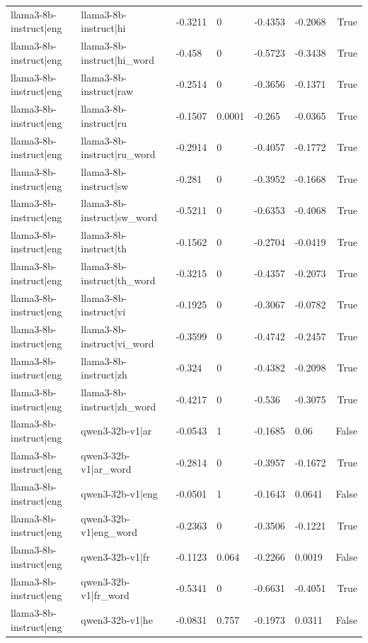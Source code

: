 \begin{table}
\begin{tabular}{llllllr}
llama3-8b-instruct|eng & llama3-8b-instruct|hi & -0.3211 & 0 & -0.4353 & -0.2068 & True \\
llama3-8b-instruct|eng & llama3-8b-instruct|hi_word & -0.458 & 0 & -0.5723 & -0.3438 & True \\
llama3-8b-instruct|eng & llama3-8b-instruct|raw & -0.2514 & 0 & -0.3656 & -0.1371 & True \\
llama3-8b-instruct|eng & llama3-8b-instruct|ru & -0.1507 & 0.0001 & -0.265 & -0.0365 & True \\
llama3-8b-instruct|eng & llama3-8b-instruct|ru_word & -0.2914 & 0 & -0.4057 & -0.1772 & True \\
llama3-8b-instruct|eng & llama3-8b-instruct|sw & -0.281 & 0 & -0.3952 & -0.1668 & True \\
llama3-8b-instruct|eng & llama3-8b-instruct|sw_word & -0.5211 & 0 & -0.6353 & -0.4068 & True \\
llama3-8b-instruct|eng & llama3-8b-instruct|th & -0.1562 & 0 & -0.2704 & -0.0419 & True \\
llama3-8b-instruct|eng & llama3-8b-instruct|th_word & -0.3215 & 0 & -0.4357 & -0.2073 & True \\
llama3-8b-instruct|eng & llama3-8b-instruct|vi & -0.1925 & 0 & -0.3067 & -0.0782 & True \\
llama3-8b-instruct|eng & llama3-8b-instruct|vi_word & -0.3599 & 0 & -0.4742 & -0.2457 & True \\
llama3-8b-instruct|eng & llama3-8b-instruct|zh & -0.324 & 0 & -0.4382 & -0.2098 & True \\
llama3-8b-instruct|eng & llama3-8b-instruct|zh_word & -0.4217 & 0 & -0.536 & -0.3075 & True \\
llama3-8b-instruct|eng & qwen3-32b-v1|ar & -0.0543 & 1 & -0.1685 & 0.06 & False \\
llama3-8b-instruct|eng & qwen3-32b-v1|ar_word & -0.2814 & 0 & -0.3957 & -0.1672 & True \\
llama3-8b-instruct|eng & qwen3-32b-v1|eng & -0.0501 & 1 & -0.1643 & 0.0641 & False \\
llama3-8b-instruct|eng & qwen3-32b-v1|eng_word & -0.2363 & 0 & -0.3506 & -0.1221 & True \\
llama3-8b-instruct|eng & qwen3-32b-v1|fr & -0.1123 & 0.064 & -0.2266 & 0.0019 & False \\
llama3-8b-instruct|eng & qwen3-32b-v1|fr_word & -0.5341 & 0 & -0.6631 & -0.4051 & True \\
llama3-8b-instruct|eng & qwen3-32b-v1|he & -0.0831 & 0.757 & -0.1973 & 0.0311 & False \\

\end{tabular}
\end{table}
